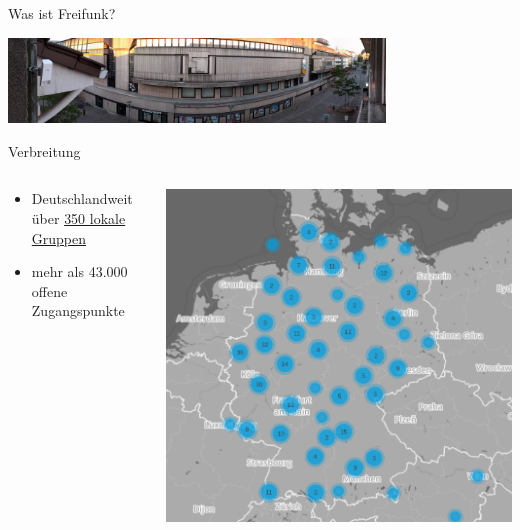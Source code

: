 \documentclass[t]{beamer}
\begin{document}
  \begin{frame}{Was ist Freifunk?}
    \begin{center}
      \includegraphics[width=10cm]{images/irl/wilhelminenstr1}
    \end{center}
  \end{frame}

  \begin{frame}{Verbreitung}
    \begin{columns}
      \begin{column}{0.6\textwidth}
        \begin{itemize}
          \item Deutschlandweit über  \href{http://freifunk.net/wie-mache-ich-mit/community-finden/}{350 lokale Gruppen}
          \item mehr als 43.000 offene Zugangspunkte
        \end{itemize}
      \end{column}
      \begin{column}{0.4\textwidth}
        \begin{center}
          \includegraphics[width=\textwidth]{images/2016-06-01_map-de}
        \end{center}
      \end{column}
    \end{columns}
  \end{frame}
\end{document}
